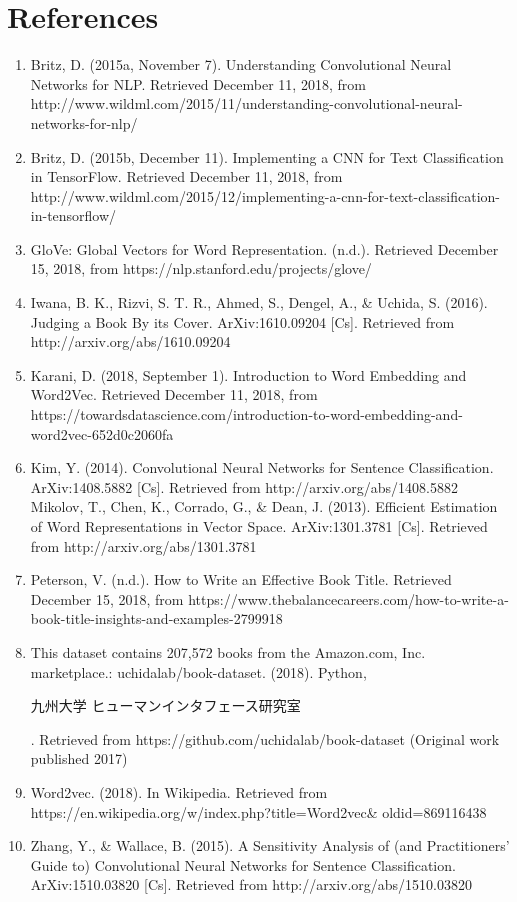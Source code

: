 \documentclass[jou,apacite, 10px]{apa6}
\begin{document}
\section{References}
\begin{enumerate}[(1)]
\item Britz, D. (2015a, November 7). Understanding Convolutional Neural Networks for NLP. Retrieved December 11, 2018, from http://www.wildml.com/2015/11/understanding-convolutional-neural-networks-for-nlp/
\item Britz, D. (2015b, December 11). Implementing a CNN for Text Classification in TensorFlow. Retrieved December 11, 2018, from http://www.wildml.com/2015/12/implementing-a-cnn-for-text-classification-in-tensorflow/
\item GloVe: Global Vectors for Word Representation. (n.d.). Retrieved December 15, 2018, from https://nlp.stanford.edu/projects/glove/
\item Iwana, B. K., Rizvi, S. T. R., Ahmed, S., Dengel, A., \& Uchida, S. (2016). Judging a Book By its Cover. ArXiv:1610.09204 [Cs]. Retrieved from http://arxiv.org/abs/1610.09204
\item Karani, D. (2018, September 1). Introduction to Word Embedding and Word2Vec. Retrieved December 11, 2018, from https://towardsdatascience.com/introduction-to-word-embedding-and-word2vec-652d0c2060fa
\item Kim, Y. (2014). Convolutional Neural Networks for Sentence Classification. ArXiv:1408.5882 [Cs]. Retrieved from http://arxiv.org/abs/1408.5882
Mikolov, T., Chen, K., Corrado, G., \& Dean, J. (2013). Efficient Estimation of Word Representations in Vector Space. ArXiv:1301.3781 [Cs]. Retrieved from http://arxiv.org/abs/1301.3781
\item Peterson, V. (n.d.). How to Write an Effective Book Title. Retrieved December 15, 2018, from https://www.thebalancecareers.com/how-to-write-a-book-title-insights-and-examples-2799918
\item This dataset contains 207,572 books from the Amazon.com, Inc. marketplace.: uchidalab/book-dataset. (2018). Python, \begin{CJK}{UTF8}{min}九州大学 ヒューマンインタフェース研究室\end{CJK}. Retrieved from https://github.com/uchidalab/book-dataset (Original work published 2017)
\item Word2vec. (2018). In Wikipedia. Retrieved from https://en.wikipedia.org/w/index.php?title=Word2vec\& oldid=869116438
\item Zhang, Y., \& Wallace, B. (2015). A Sensitivity Analysis of (and Practitioners’ Guide to) Convolutional Neural Networks for Sentence Classification. ArXiv:1510.03820 [Cs]. Retrieved from http://arxiv.org/abs/1510.03820
\end{enumerate}
\end{document}
